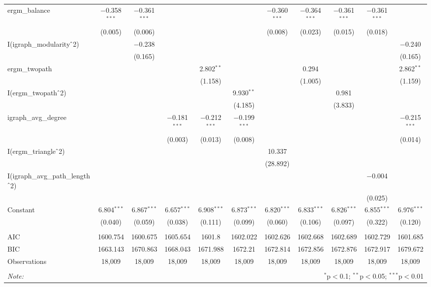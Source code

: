 \begin{table}[!htbp]
\begin{tabular}{@{\extracolsep{5pt}}lcccccccccc}
  ergm\_balance & $-$0.358$^{***}$ & $-$0.361$^{***}$ &  &  &  & $-$0.360$^{***}$ & $-$0.364$^{***}$ & $-$0.361$^{***}$ & $-$0.361$^{***}$ &  \\ 
  & (0.005) & (0.006) &  &  &  & (0.008) & (0.023) & (0.015) & (0.018) &  \\ 
  I(igraph\_modularity$\hat{\mkern6mu}$2) &  & $-$0.238 &  &  &  &  &  &  &  & $-$0.240 \\ 
  &  & (0.165) &  &  &  &  &  &  &  & (0.165) \\ 
  ergm\_twopath &  &  &  & 2.802$^{**}$ &  &  & 0.294 &  &  & 2.862$^{**}$ \\ 
  &  &  &  & (1.158) &  &  & (1.005) &  &  & (1.159) \\ 
  I(ergm\_twopath$\hat{\mkern6mu}$2) &  &  &  &  & 9.930$^{**}$ &  &  & 0.981 &  &  \\ 
  &  &  &  &  & (4.185) &  &  & (3.833) &  &  \\ 
  igraph\_avg\_degree &  &  & $-$0.181$^{***}$ & $-$0.212$^{***}$ & $-$0.199$^{***}$ &  &  &  &  & $-$0.215$^{***}$ \\ 
  &  &  & (0.003) & (0.013) & (0.008) &  &  &  &  & (0.014) \\ 
  I(ergm\_triangle$\hat{\mkern6mu}$2) &  &  &  &  &  & 10.337 &  &  &  &  \\ 
  &  &  &  &  &  & (28.892) &  &  &  &  \\ 
  I(igraph\_avg\_path\_length$\hat{\mkern6mu}$2) &  &  &  &  &  &  &  &  & $-$0.004 &  \\ 
  &  &  &  &  &  &  &  &  & (0.025) &  \\ 
  Constant & 6.804$^{***}$ & 6.867$^{***}$ & 6.657$^{***}$ & 6.908$^{***}$ & 6.873$^{***}$ & 6.820$^{***}$ & 6.833$^{***}$ & 6.826$^{***}$ & 6.855$^{***}$ & 6.976$^{***}$ \\ 
  & (0.040) & (0.059) & (0.038) & (0.111) & (0.099) & (0.060) & (0.106) & (0.097) & (0.322) & (0.120) \\ 
 \hline \\[-1.8ex] 
AIC & 1600.754 & 1600.675 & 1605.654 & 1601.8 & 1602.022 & 1602.626 & 1602.668 & 1602.689 & 1602.729 & 1601.685 \\ 
BIC & 1663.143 & 1670.863 & 1668.043 & 1671.988 & 1672.21 & 1672.814 & 1672.856 & 1672.876 & 1672.917 & 1679.672 \\ 
Observations & 18,009 & 18,009 & 18,009 & 18,009 & 18,009 & 18,009 & 18,009 & 18,009 & 18,009 & 18,009 \\ 
\hline 
\hline \\[-1.8ex] 
\textit{Note:}  & \multicolumn{10}{r}{$^{*}$p$<$0.1; $^{**}$p$<$0.05; $^{***}$p$<$0.01} \\ 
\end{tabular} 
\end{table} 
